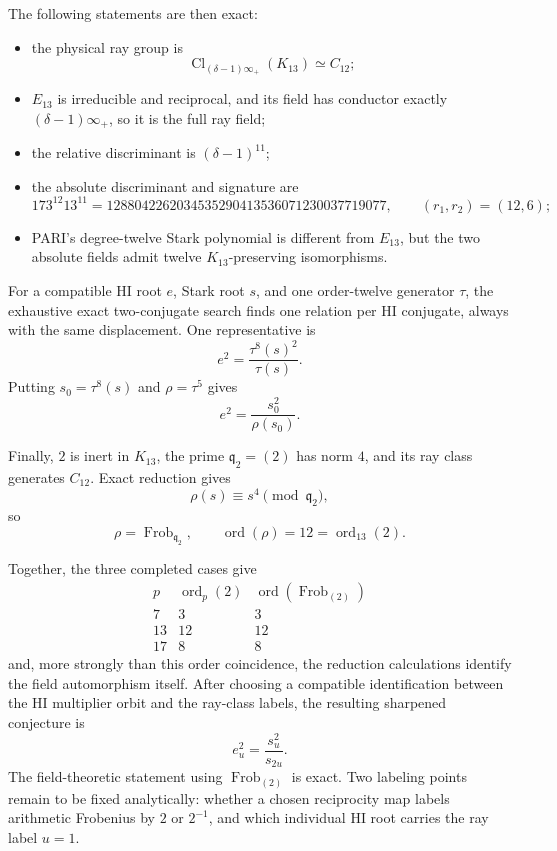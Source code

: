 \documentclass[11pt,reqno]{amsart}
\theoremstyle{plain}
\begin{document}
The following statements are then exact:

\begin{itemize}
\item the physical ray group is
\[
\operatorname{Cl}_{(\delta-1)\infty_+}(K_{13})\simeq C_{12};
\]
\item \(E_{13}\) is irreducible and reciprocal, and its field has conductor exactly \((\delta-1)\infty_+\), so it is the full ray field;
\item the relative discriminant is \((\delta-1)^{11}\);
\item the absolute discriminant and signature are
\[
173^{12}13^{11}
=1288042262034535290413536071230037719077,
\qquad
(r_1,r_2)=(12,6);
\]
\item PARI's degree-twelve Stark polynomial is different from \(E_{13}\), but the two absolute fields admit twelve \(K_{13}\)-preserving isomorphisms.
\end{itemize}

For a compatible HI root \(e\), Stark root \(s\), and one order-twelve generator \(\tau\), the exhaustive exact two-conjugate search finds one relation per HI conjugate, always with the same displacement. One representative is
\[
e^2=\frac{\tau^8(s)^2}{\tau(s)}.
\]
Putting \(s_0=\tau^8(s)\) and \(\rho=\tau^5\) gives
\[
\boxed{
e^2=\frac{s_0^2}{\rho(s_0)}.
}
\]

Finally, \(2\) is inert in \(K_{13}\), the prime \(\mathfrak q_2=(2)\) has norm \(4\), and its ray class generates \(C_{12}\). Exact reduction gives
\[
\rho(s)\equiv s^4\pmod{\mathfrak q_2},
\]
so
\[
\rho=\operatorname{Frob}_{\mathfrak q_2},
\qquad
\operatorname{ord}(\rho)=12=\operatorname{ord}_{13}(2).
\]

Together, the three completed cases give
\[
\begin{array}{c|c|c}
p & \operatorname{ord}_p(2) & \operatorname{ord}(\operatorname{Frob}_{(2)})\\ \hline
7&3&3\\
13&12&12\\
17&8&8
\end{array}
\]
and, more strongly than this order coincidence, the reduction calculations identify the field automorphism itself. After choosing a compatible identification between the HI multiplier orbit and the ray-class labels, the resulting sharpened conjecture is
\[
\boxed{
e_u^2=\frac{s_u^2}{s_{2u}}.
}
\]
The field-theoretic statement using \(\operatorname{Frob}_{(2)}\) is exact. Two labeling points remain to be fixed analytically: whether a chosen reciprocity map labels arithmetic Frobenius by \(2\) or \(2^{-1}\), and which individual HI root carries the ray label \(u=1\).
\end{document}
